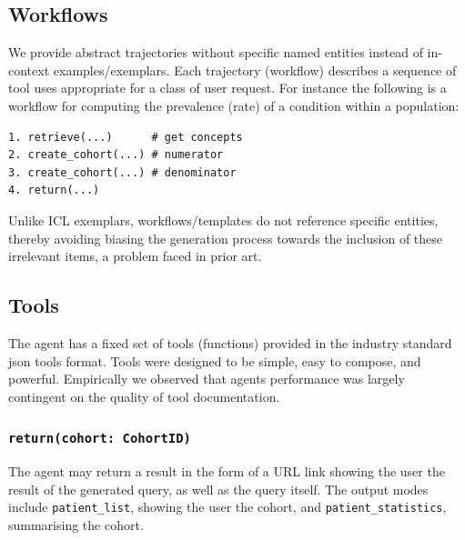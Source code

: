 \documentclass[11pt]{article}
\begin{document}
\subsection{Workflows}

We provide abstract trajectories without specific named entities instead of in-context examples/exemplars.
Each trajectory (workflow) describes a sequence of tool uses appropriate for a class of user request.
For instance the following is a workflow for computing the prevalence (rate) of a condition within a population:
\begin{verbatim}
1. retrieve(...)      # get concepts
2. create_cohort(...) # numerator
3. create_cohort(...) # denominator
4. return(...)
\end{verbatim}

Unlike ICL exemplars, workflows/templates do not reference specific entities, thereby avoiding biasing the generation process towards the inclusion of these irrelevant items, a problem faced in prior art.

\subsection{Tools}
The agent has a fixed set of tools (functions) provided in the industry standard json tools format.
Tools were designed to be simple, easy to compose, and powerful.
Empirically we observed that agents performance was largely contingent on the quality of tool documentation.

\subsubsection*{\texttt{return(cohort: CohortID)}}
The agent may return a result in the form of a URL link showing the user the result of the generated query, as well as the query itself.
The output modes include \texttt{patient\_list}, showing the user the cohort, and \texttt{patient\_statistics}, summarising the cohort.
\end{document}
